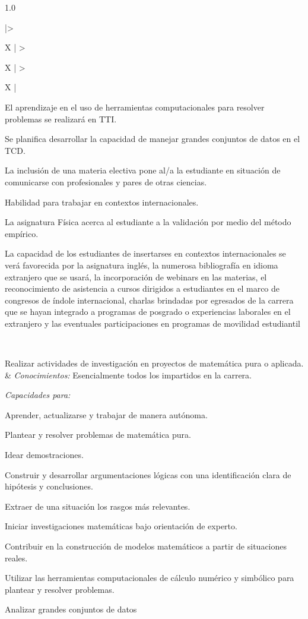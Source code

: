 \documentclass[a4paper, 12pt]{article}
\begin{document}
\begin{center}
\begin{xltabular}{1.0\textwidth}{|>{\raggedright\arraybackslash}X |
>{\raggedright\arraybackslash}X |
>{\raggedright\arraybackslash}X |
}
  El aprendizaje en el uso de herramientas computacionales para resolver problemas se realizará en  TTI.
  
  Se planifica desarrollar la capacidad de manejar grandes conjuntos de datos en el TCD.


 La inclusión de una materia electiva pone al/a la estudiante en situación de comunicarse con profesionales y pares de otras ciencias.
 
  Habilidad para trabajar en contextos internacionales.

  La asignatura Física acerca  al estudiante a la validación por medio del método empírico.
  
 La capacidad de los estudiantes de insertarses en contextos internacionales se verá favorecida por la asignatura inglés, la numerosa bibliografía en idioma extranjero que se usará, la incorporación de webinars en las materias, el reconocimiento de asistencia a cursos dirigidos a estudiantes en el marco de congresos de índole internacional, charlas brindadas por egresados de la carrera que se hayan integrado a programas de posgrado o experiencias laborales en el extranjero    y las eventuales participaciones en programas de movilidad estudiantil  

 \\ \hline
    

  Realizar actividades de investigación en proyectos de matemática pura o aplicada.
  & 
  \emph{Conocimientos:}  Esencialmente todos los impartidos en la carrera.
  
  \emph{Capacidades para:}
  
   Aprender, actualizarse y trabajar de manera autónoma.
   
  Plantear y resolver problemas de matemática pura.
  
 Idear demostraciones.

  Construir y desarrollar argumentaciones lógicas con
una identificación clara de hipótesis y conclusiones.

Extraer de una situación los rasgos más
relevantes.

Iniciar investigaciones matemáticas bajo orientación
de experto.


 Contribuir en la construcción de modelos matemáticos a partir de situaciones reales.
 
Utilizar las herramientas computacionales de cálculo
numérico y simbólico para plantear y resolver problemas.

Analizar grandes conjuntos de datos


\end{xltabular}
\end{center}
\end{document}
